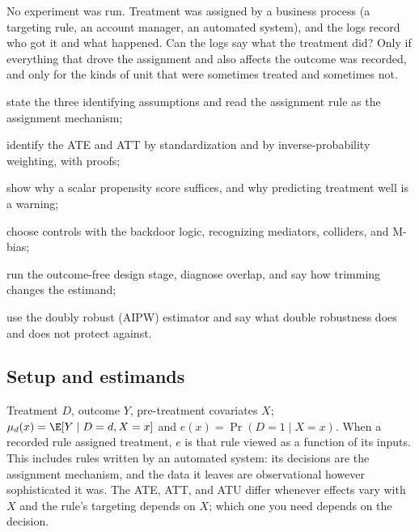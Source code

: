 \documentclass[11pt]{article}
\begin{document}

\begin{decision}
No experiment was run. Treatment was assigned by a business process (a targeting rule, an account manager, an automated
system), and the logs record who got it and what happened. Can the logs say what the treatment did? Only if everything
that drove the assignment and also affects the outcome was recorded, and only for the kinds of unit that were sometimes
treated and sometimes not.
\end{decision}

\begin{goals}
  \item state the three identifying assumptions and read the assignment rule as the assignment mechanism;
  \item identify the ATE and ATT by standardization and by inverse-probability weighting, with proofs;
  \item show why a scalar propensity score suffices, and why predicting treatment well is a warning;
  \item choose controls with the backdoor logic, recognizing mediators, colliders, and M-bias;
  \item run the outcome-free design stage, diagnose overlap, and say how trimming changes the estimand;
  \item use the doubly robust (AIPW) estimator and say what double robustness does and does not protect against.
\end{goals}

\sectionone

\subsection{Setup and estimands}

Treatment $D$, outcome $Y$, pre-treatment covariates $X$; $\mu_d(x) = \E[Y \mid D=d, X=x]$ and $e(x) = \Pr(D=1 \mid X=x)$. When a
recorded rule assigned treatment, $e$ is that rule viewed as a function of its inputs. This includes rules written by an
automated system: its decisions are the assignment mechanism, and the data it leaves are observational however sophisticated
it was. The ATE, ATT, and ATU differ whenever effects vary with $X$ and the rule's targeting depends on $X$; which one you
need depends on the decision.
\end{document}
